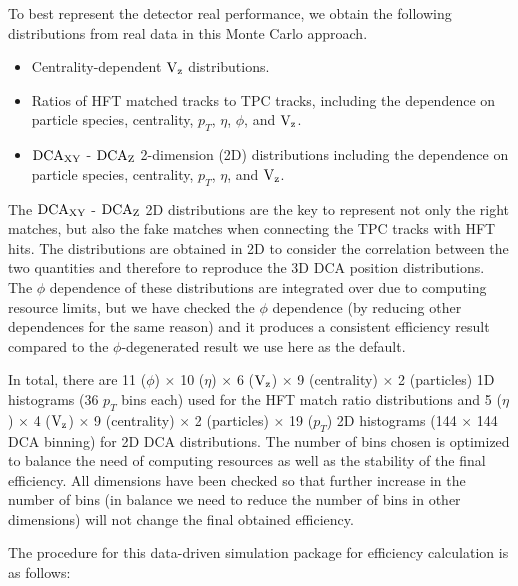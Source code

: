 \documentclass[%
 reprint,	
 amsmath,amssymb,
 aps,
 prc,
]{revtex4-1}
\begin{document}
To best represent the detector real performance, we obtain the following distributions from real data in this Monte Carlo approach.
 \begin{itemize} 
\item Centrality-dependent $\textup{V}_\textup{z}$ distributions.
\item Ratios of HFT matched tracks to TPC tracks, including the dependence on particle species, centrality, $p_T$, $\eta$, $\phi$, and $\textup{V}_\textup{z}$.
\item $\textup{DCA}_{\textup{XY}}$ - $\textup{DCA}_{\textup{Z}}$ 2-dimension (2D) distributions including the dependence on particle species, centrality, $p_T$, $\eta$, and $\textup{V}_\textup{z}$.
 \end{itemize} 
The $\textup{DCA}_{\textup{XY}}$ - $\textup{DCA}_{\textup{Z}}$ 2D distributions are the key to represent not only the right matches, but also the fake matches when connecting the TPC tracks with HFT hits. The distributions are obtained in 2D to consider the correlation between the two quantities and therefore to reproduce the 3D DCA position distributions. The $\phi$ dependence of these distributions are integrated over due to computing resource limits, but we have checked the $\phi$ dependence (by reducing other dependences for the same reason) and it produces a consistent efficiency result compared to the $\phi$-degenerated result we use here as the default.

In total, there are 11 ($\phi$) $\times$ 10 ($\eta$) $\times$ 6 ($\textup{V}_\textup{z}$) $\times$ 9 (centrality) $\times$ 2 (particles) 1D histograms (36 $p_T$ bins each) used for the HFT match ratio distributions and 5 ($\eta$) $\times$ 4 ($\textup{V}_\textup{z}$) $\times$ 9 (centrality) $\times$ 2 (particles) $\times$ 19 ($p_T$) 2D histograms (144 $\times$ 144 DCA binning) for 2D DCA distributions. The number of bins chosen is optimized to balance the need of computing resources as well as the stability of the final efficiency. All dimensions have been checked so that further increase in the number of bins (in balance we need to reduce the number of bins in other dimensions)  will not change the final obtained efficiency.

The procedure for this data-driven simulation package for efficiency calculation is as follows:
\end{document}
